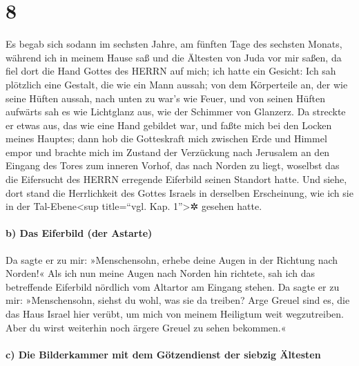 \hypertarget{section-7}{%
\section{8}\label{section-7}}

Es begab sich sodann im sechsten Jahre, am fünften Tage
des sechsten Monats, während ich in meinem Hause saß und die Ältesten
von Juda vor mir saßen, da fiel dort die Hand Gottes des HERRN auf mich;
ich hatte ein Gesicht: Ich sah plötzlich eine Gestalt, die
wie ein Mann aussah; von dem Körperteile an, der wie seine Hüften
aussah, nach unten zu war's wie Feuer, und von seinen Hüften aufwärts
sah es wie Lichtglanz aus, wie der Schimmer von Glanzerz.
Da streckte er etwas aus, das wie eine Hand gebildet war,
und faßte mich bei den Locken meines Hauptes; dann hob die Gotteskraft
mich zwischen Erde und Himmel empor und brachte mich im Zustand der
Verzückung nach Jerusalem an den Eingang des Tores zum inneren Vorhof,
das nach Norden zu liegt, woselbst das die Eifersucht des HERRN
erregende Eiferbild seinen Standort hatte. Und siehe, dort
stand die Herrlichkeit des Gottes Israels in derselben Erscheinung, wie
ich sie in der Tal-Ebene\textless sup title=``vgl. Kap. 1''\textgreater✲
gesehen hatte.

\hypertarget{b-das-eiferbild-der-astarte}{%
\paragraph{b) Das Eiferbild (der
Astarte)}\label{b-das-eiferbild-der-astarte}}

Da sagte er zu mir: »Menschensohn, erhebe deine Augen in
der Richtung nach Norden!« Als ich nun meine Augen nach Norden hin
richtete, sah ich das betreffende Eiferbild nördlich vom Altartor am
Eingang stehen. Da sagte er zu mir: »Menschensohn, siehst
du wohl, was sie da treiben? Arge Greuel sind es, die das Haus Israel
hier verübt, um mich von meinem Heiligtum weit wegzutreiben. Aber du
wirst weiterhin noch ärgere Greuel zu sehen bekommen.«

\hypertarget{c-die-bilderkammer-mit-dem-guxf6tzendienst-der-siebzig-uxe4ltesten}{%
\paragraph{c) Die Bilderkammer mit dem Götzendienst der siebzig
Ältesten}\label{c-die-bilderkammer-mit-dem-guxf6tzendienst-der-siebzig-uxe4ltesten}}

